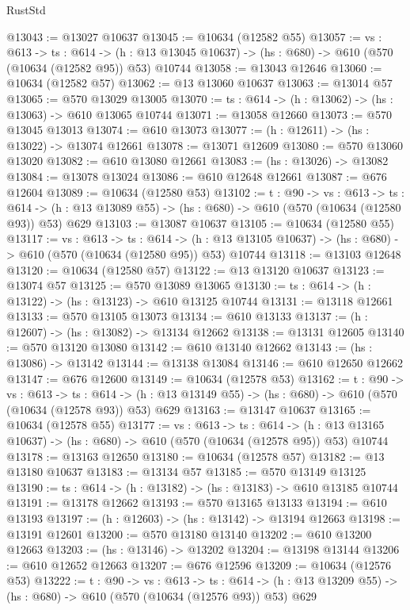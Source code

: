 \begin{lexlean}{RustStd}
\begin{coremodule}
@13043 := @13027 @10637
@13045 := @10634 (@12582 @55)
@13057 := {vs : @613} ->
  {ts : @614} ->
  (h : @13 @13045 @10637) -> (hs : @680) -> @610 (@570 (@10634 (@12582 @95)) @53) @10744
@13058 := @13043 @12646
@13060 := @10634 (@12582 @57)
@13062 := @13 @13060 @10637
@13063 := @13014 @57
@13065 := @570 @13029 @13005
@13070 := {ts : @614} -> (h : @13062) -> (hs : @13063) -> @610 @13065 @10744
@13071 := @13058 @12660
@13073 := @570 @13045 @13013
@13074 := @610 @13073
@13077 := (h : @12611) -> (hs : @13022) -> @13074 @12661
@13078 := @13071 @12609
@13080 := @570 @13060 @13020
@13082 := @610 @13080 @12661
@13083 := (hs : @13026) -> @13082
@13084 := @13078 @13024
@13086 := @610 @12648 @12661
@13087 := @676 @12604
@13089 := @10634 (@12580 @53)
@13102 := {t : @90} ->
  {vs : @613} ->
  {ts : @614} -> (h : @13 @13089 @55) -> (hs : @680) -> @610 (@570 (@10634 (@12580 @93)) @53) @629
@13103 := @13087 @10637
@13105 := @10634 (@12580 @55)
@13117 := {vs : @613} ->
  {ts : @614} ->
  (h : @13 @13105 @10637) -> (hs : @680) -> @610 (@570 (@10634 (@12580 @95)) @53) @10744
@13118 := @13103 @12648
@13120 := @10634 (@12580 @57)
@13122 := @13 @13120 @10637
@13123 := @13074 @57
@13125 := @570 @13089 @13065
@13130 := {ts : @614} -> (h : @13122) -> (hs : @13123) -> @610 @13125 @10744
@13131 := @13118 @12661
@13133 := @570 @13105 @13073
@13134 := @610 @13133
@13137 := (h : @12607) -> (hs : @13082) -> @13134 @12662
@13138 := @13131 @12605
@13140 := @570 @13120 @13080
@13142 := @610 @13140 @12662
@13143 := (hs : @13086) -> @13142
@13144 := @13138 @13084
@13146 := @610 @12650 @12662
@13147 := @676 @12600
@13149 := @10634 (@12578 @53)
@13162 := {t : @90} ->
  {vs : @613} ->
  {ts : @614} -> (h : @13 @13149 @55) -> (hs : @680) -> @610 (@570 (@10634 (@12578 @93)) @53) @629
@13163 := @13147 @10637
@13165 := @10634 (@12578 @55)
@13177 := {vs : @613} ->
  {ts : @614} ->
  (h : @13 @13165 @10637) -> (hs : @680) -> @610 (@570 (@10634 (@12578 @95)) @53) @10744
@13178 := @13163 @12650
@13180 := @10634 (@12578 @57)
@13182 := @13 @13180 @10637
@13183 := @13134 @57
@13185 := @570 @13149 @13125
@13190 := {ts : @614} -> (h : @13182) -> (hs : @13183) -> @610 @13185 @10744
@13191 := @13178 @12662
@13193 := @570 @13165 @13133
@13194 := @610 @13193
@13197 := (h : @12603) -> (hs : @13142) -> @13194 @12663
@13198 := @13191 @12601
@13200 := @570 @13180 @13140
@13202 := @610 @13200 @12663
@13203 := (hs : @13146) -> @13202
@13204 := @13198 @13144
@13206 := @610 @12652 @12663
@13207 := @676 @12596
@13209 := @10634 (@12576 @53)
@13222 := {t : @90} ->
  {vs : @613} ->
  {ts : @614} -> (h : @13 @13209 @55) -> (hs : @680) -> @610 (@570 (@10634 (@12576 @93)) @53) @629

\end{coremodule}
\end{lexlean}
